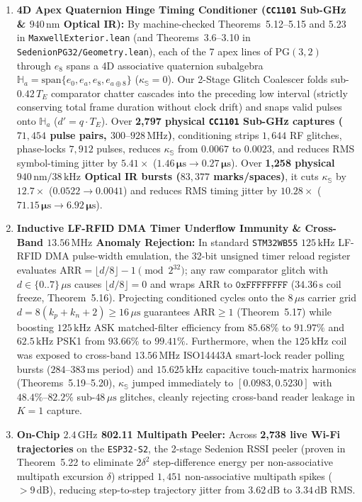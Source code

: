 \documentclass[journal,twoside]{IEEEtran}
\theoremstyle{definition}
\theoremstyle{remark}
\newcommand{\Se}{\mathbb{S}}
\newcommand{\PG}{\mathrm{PG}}
\newcommand{\kappas}{\kappa_{\Se}}
\begin{document}
\begin{enumerate}
    \item \textbf{4D Apex Quaternion Hinge Timing Conditioner (\texttt{CC1101} Sub-GHz \& $940\,\mathrm{nm}$ Optical IR):} By machine-checked Theorems~5.12--5.15 and 5.23 in \texttt{MaxwellExterior.lean} (and Theorems~3.6--3.10 in \texttt{SedenionPG32/Geometry.lean}), each of the 7 apex lines of $\PG(3,2)$ through $e_8$ spans a 4D associative quaternion subalgebra $\mathbb{H}_a = \mathrm{span}\{e_0, e_a, e_8, e_{a\oplus 8}\}$ ($\kappas = 0$). Our 2-Stage Glitch Coalescer folds sub-$0.42\,T_E$ comparator chatter cascades into the preceding low interval (strictly conserving total frame duration without clock drift) and snaps valid pulses onto $\mathbb{H}_a$ ($d' = q\cdot T_E$). Over \textbf{2,797 physical \texttt{CC1101} Sub-GHz captures ($71{,}454$ pulse pairs, $300\text{--}928\,\mathrm{MHz}$)}, conditioning strips $1{,}644$ RF glitches, phase-locks $7{,}912$ pulses, reduces $\kappas$ from $0.0067$ to $0.0023$, and reduces RMS symbol-timing jitter by $\mathbf{5.41\times}$ ($\mathbf{1.46\,\mu\mathrm{s} \to 0.27\,\mu\mathrm{s}}$). Over \textbf{1,258 physical $940\,\mathrm{nm}/38\,\mathrm{kHz}$ Optical IR bursts ($83{,}377$ marks/spaces)}, it cuts $\kappas$ by $\mathbf{12.7\times}$ ($0.0522 \to 0.0041$) and reduces RMS timing jitter by $\mathbf{10.28\times}$ ($\mathbf{71.15\,\mu\mathrm{s} \to 6.92\,\mu\mathrm{s}}$).
    \item \textbf{Inductive LF-RFID DMA Timer Underflow Immunity \& Cross-Band $13.56\,\mathrm{MHz}$ Anomaly Rejection:} In standard \texttt{STM32WB55} $125\,\mathrm{kHz}$ LF-RFID DMA pulse-width emulation, the 32-bit unsigned timer reload register evaluates $\mathrm{ARR} = \lfloor d/8 \rfloor - 1 \pmod{2^{32}}$; any raw comparator glitch with $d \in \{0..7\}\,\mu\mathrm{s}$ causes $\lfloor d/8 \rfloor = 0$ and wraps $\mathrm{ARR}$ to $\mathtt{0xFFFFFFFF}$ ($34.36\,\mathrm{s}$ coil freeze, Theorem~5.16). Projecting conditioned cycles onto the $8\,\mu\mathrm{s}$ carrier grid $d = 8(k_p + k_n + 2) \ge 16\,\mu\mathrm{s}$ guarantees $\mathrm{ARR} \ge 1$ (Theorem~5.17) while boosting $125\,\mathrm{kHz}$ ASK matched-filter efficiency from $85.68\%$ to $91.97\%$ and $62.5\,\mathrm{kHz}$ PSK1 from $93.66\%$ to $99.41\%$. Furthermore, when the $125\,\mathrm{kHz}$ coil was exposed to cross-band $13.56\,\mathrm{MHz}$ ISO14443A smart-lock reader polling bursts ($284\text{--}383\,\mathrm{ms}$ period) and $15.625\,\mathrm{kHz}$ capacitive touch-matrix harmonics (Theorems~5.19--5.20), $\kappas$ jumped immediately to $[0.0983, 0.5230]$ with $48.4\%\text{--}82.2\%$ sub-$48\,\mu\mathrm{s}$ glitches, cleanly rejecting cross-band reader leakage in $K=1$ capture.
    \item \textbf{On-Chip $2.4\,\mathrm{GHz}$ 802.11 Multipath Peeler:} Across \textbf{2,738 live Wi-Fi trajectories} on the \texttt{ESP32-S2}, the 2-stage Sedenion RSSI peeler (proven in Theorem~5.22 to eliminate $2\delta^2$ step-difference energy per non-associative multipath excursion $\delta$) stripped $1{,}451$ non-associative multipath spikes ($>9\,\mathrm{dB}$), reducing step-to-step trajectory jitter from $3.62\,\mathrm{dB}$ to $3.34\,\mathrm{dB}$ RMS.
\end{enumerate}
\end{document}
